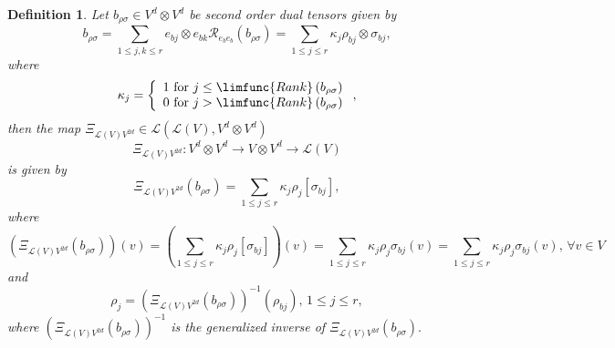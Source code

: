 \documentclass[aps,preprint]{revtex4}
\newtheorem{definition}[theorem]{Definition}
\begin{document}
\begin{definition}
Let $b_{\rho \sigma }\in V^{d}\otimes V^{d}$ be second order dual tensors
given by 
\begin{equation}
b_{\rho \sigma }=\sum_{1\leq j,k\leq r}e_{bj}\otimes e_{bk}\mathcal{R}%
_{e_{b}e_{b}}\left( b_{\rho \sigma }\right) =\sum_{1\leq j\leq r}\kappa
_{j}\rho _{bj}\otimes \sigma _{bj},
\end{equation}%
where 
\begin{equation}
\kappa _{j}=\left\{ 
\begin{array}{c}
1\text{ for }j\leq \limfunc{Rank}\left( b_{\rho \sigma }\right) \\ 
0\text{ for }j>\limfunc{Rank}\left( b_{\rho \sigma }\right)%
\end{array}%
\right. ,
\end{equation}%
then the map $\Xi _{\mathcal{L}\left( V\right) V^{2d}}\in \mathcal{L}\left( 
\mathcal{L}\left( V\right) ,V^{d}\otimes V^{d}\right) $ 
\begin{equation}
\Xi _{\mathcal{L}\left( V\right) V^{2d}}:V^{d}\otimes V^{d}\rightarrow
V\otimes V^{d}\rightarrow \mathcal{L}\left( V\right)
\end{equation}%
is given by 
\begin{equation}
\Xi _{\mathcal{L}\left( V\right) V^{2d}}\left( b_{\rho \sigma }\right)
=\sum_{1\leq j\leq r}\kappa _{j}\rho _{j}\left[ \sigma _{bj}\right] ,
\end{equation}%
where 
\begin{equation}
\left( \overset{}{\Xi _{\mathcal{L}\left( V\right) V^{2d}}\left( b_{\rho
\sigma }\right) }\right) \left( v\right) =\left( \sum_{1\leq j\leq r}\kappa
_{j}\rho _{j}\left[ \sigma _{bj}\right] \right) \left( v\right) =\sum_{1\leq
j\leq r}\kappa _{j}\rho _{j}\sigma _{bj}\left( v\right) =\sum_{1\leq j\leq
r}\kappa _{j}\rho _{j}\sigma _{bj}\left( v\right) ,\,\forall v\in V
\end{equation}%
and 
\begin{equation}
\rho _{j}=\left( \Xi _{\mathcal{L}\left( V\right) V^{2d}}\left( b_{\rho
\sigma }\right) \right) ^{-1}\left( \rho _{bj}\right) ,\,1\leq j\leq r,
\end{equation}%
where $\left( \Xi _{\mathcal{L}\left( V\right) V^{2d}}\left( b_{\rho \sigma
}\right) \right) ^{-1}$ is the generalized inverse of $\Xi _{\mathcal{L}%
\left( V\right) V^{2d}}\left( b_{\rho \sigma }\right) .$
\end{definition}
\end{document}
